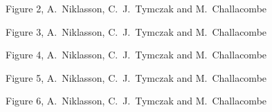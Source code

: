\commentoutA{\documentclass[prl,aps,twocolumn,showpacs,twocolumngrid,superbib]{revtex4}}
\begin{document}
{\clearpage

\begin{center}
Figure 2, A.~Niklasson,  C.~J.~Tymczak and M.~Challacombe \\[1.cm]
\end{center}

\clearpage

\begin{center}
Figure 3, A.~Niklasson,  C.~J.~Tymczak and M.~Challacombe \\[1.cm]
\end{center}

\clearpage

\begin{center}
Figure 4, A.~Niklasson,  C.~J.~Tymczak and M.~Challacombe \\[1.cm]
\end{center}

\clearpage

\begin{center}
Figure 5, A.~Niklasson,  C.~J.~Tymczak and M.~Challacombe \\[1.cm]
\end{center}

\clearpage

\begin{center}
Figure 6, A.~Niklasson,  C.~J.~Tymczak and M.~Challacombe \\[1.cm]
\end{center}

}
\end{document}
